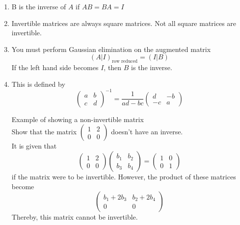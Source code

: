 \documentclass[journal, letterpaper]{IEEEtran}
\begin{document}
    \begin{enumerate}
        \item B is the inverse of $A$ if $AB = BA = I$
        \item Invertible matrices are always square matrices. Not all square matrices are invertible.
        \item You must perform Gaussian elimination on the augmented matrix 
        $$ (A | I)_{\text{row reduced}} = (I | B)$$
        If the left hand side becomes $I$, then $B$ is the inverse.
        \item This is defined by 
        $$ \begin{pmatrix}
            a & b \\ c & d
        \end{pmatrix}^{-1} = \frac{1}{ad - bc}\begin{pmatrix}
            d & -b \\ -c & a
        \end{pmatrix}$$
        \begin{myboxg}{Example of showing a non-invertible matrix} \\ 
            Show that the matrix $\begin{pmatrix}
                1 & 2 \\ 0 & 0
            \end{pmatrix}$ doesn't have an inverse.
        \newline \\
        It is given that
        $$ 
        \begin{pmatrix}
            1 & 2 \\ 0 & 0
        \end{pmatrix} \begin{pmatrix}
            b_1 & b_2 \\ b_3 & b_4
        \end{pmatrix} = \begin{pmatrix}
            1 & 0 \\ 0 & 1
        \end{pmatrix}
        $$
        if the matrix were to be invertible. However, the product of these matrices become
        $$ 
        \begin{pmatrix}
            b_1 + 2b_3 & b_2 + 2b_4 \\ 
            0 & 0
        \end{pmatrix}
        $$
        Thereby, this matrix cannot be invertible.
        \end{myboxg}
    \end{enumerate}
\end{document}
